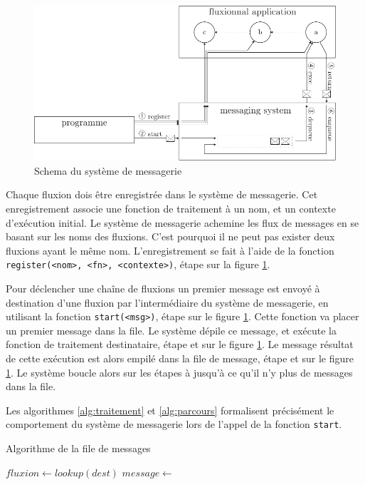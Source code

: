 \begin{figure}[h!]
  \includegraphics[width=\linewidth]{schema-message.pdf}
  \caption{Schema du système de messagerie}
  \label{fig:messagerie}
\end{figure}

Chaque fluxion dois être enregistrée dans le système de messagerie.
Cet enregistrement associe une fonction de traitement à un nom, et un contexte d'exécution initial.
Le système de messagerie achemine les flux de messages en se basant sur les noms des fluxions.
C'est pourquoi il ne peut pas exister deux fluxions ayant le même nom.
L'enregistrement se fait à l'aide de la fonction \texttt{register(<nom>, <fn>, <contexte>)}, étape  sur la figure \ref{fig:messagerie}.

Pour déclencher une chaîne de fluxions un premier message est envoyé à destination d'une fluxion par l'intermédiaire du système de messagerie, en utilisant la fonction \texttt{start(<msg>)}, étape  sur le figure \ref{fig:messagerie}.
Cette fonction va placer un premier message dans la file.
Le système dépile ce message, et exécute la fonction de traitement destinataire, étape  et  sur le figure \ref{fig:messagerie}.
Le message résultat de cette exécution est alors empilé dans la file de message, étape  et  sur le figure \ref{fig:messagerie}.
Le système boucle alors sur les étapes  à  jusqu'à ce qu'il n'y plus de messages dans la file.

Les algorithmes \ref{alg:traitement} et \ref{alg:parcours} formalisent précisément le comportement du système de messagerie lors de l'appel de la fonction \texttt{start}.

\begin{algorithm}
\caption{Algorithme de la file de messages}
\label{alg:traitement}
\begin{algorithmic}
\State $fluxion \gets lookup(dest)$
\State $message \gets$  
\State {} 
\EndFor
\EndFunction
\end{algorithmic}
\end{algorithm}

